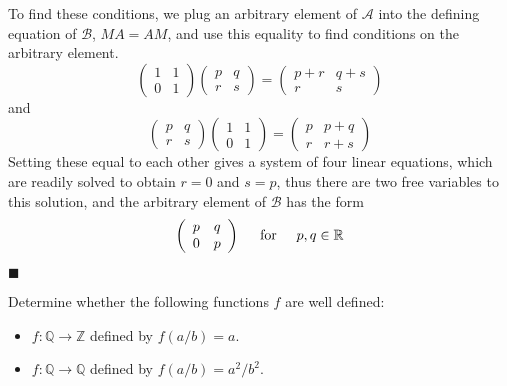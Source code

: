 \documentclass[12pt]{article}
\renewcommand{\qed}{\hfill$\blacksquare$}
\renewenvironment{proof}{\begin{addmargin}[1em]{0em}\begin{newproof}}{\end{newproof}\end{addmargin}\qed}
\newenvironment{problem}[2][Exercise]{\begin{trivlist}
\item[\hskip \labelsep {\bfseries #1}\hskip \labelsep {\bfseries #2.}]}{\end{trivlist}}
\begin{document}
\begin{proof}
To find these conditions, we plug an arbitrary element of $\mathcal{A}$ into the defining equation of $\mathcal{B}$, $MA=AM$, and use this equality to find conditions on the arbitrary element.
\begin{equation*}
    \left(\begin{array}{cc} 1 & 1 \\ 0 & 1 \end{array}\right)\left(\begin{array}{cc} p & q \\ r & s \end{array}\right) = \left(\begin{array}{cc} p+r & q+s \\ r & s \end{array}\right)
\end{equation*}
and
\begin{equation*}
    \left(\begin{array}{cc} p & q \\ r & s \end{array}\right)\left(\begin{array}{cc} 1 & 1 \\ 0 & 1 \end{array}\right) = \left(\begin{array}{cc} p & p+q \\ r & r+s \end{array}\right)
\end{equation*}
Setting these equal to each other gives a system of four linear equations, which are readily solved to obtain $r=0$ and $s=p$, thus there are two free variables to this solution, and the arbitrary element of $\mathcal{B}$ has the form
\begin{equation*}
    \left(\begin{array}{cc} p & q \\ 0 & p \end{array}\right) \hspace{5mm} \text{for} \hspace{5mm} p,q\in \mathbb{R}
\end{equation*}
\end{proof}


\begin{problem}{0.1.5}
Determine whether the following functions $f$ are well defined:
\begin{itemize}
    \item $f:\mathbb{Q}\rightarrow \mathbb{Z}$ defined by $f\left(a/b\right)=a$.
    \item $f:\mathbb{Q}\rightarrow \mathbb{Q}$ defined by $f\left(a/b\right)=a^2/b^2$.
\end{itemize}
\end{problem}
\end{document}
